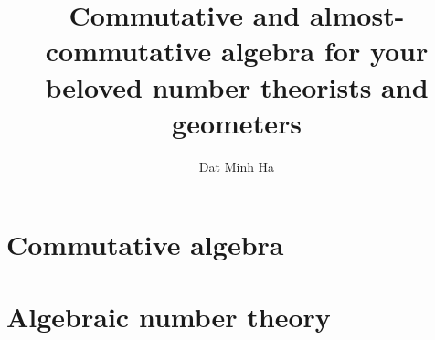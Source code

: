 




    \frontmatter

	\title{Commutative and almost-commutative algebra for your beloved number theorists and geometers}
	
	\author{Dat Minh Ha}
	\maketitle
	
	{
      \hypersetup{} 
      \dominitoc
      \tableofcontents %
    }
	
	\newpage
	
	{
      \hypersetup{hidelinks} 
      \listoftodos
    }
    
    
	
	
	
	\mainmatter
	
	\part{Commutative algebra}  
        
	
	    
	    
	    
	    
	    
	    
	    
	    
	    
	    
	    
	
	\part{Algebraic number theory}
	    
	
	    
	    
	    
	    
	    
	    
	    
	    
	    
	    
	    
	    
	    
	    
